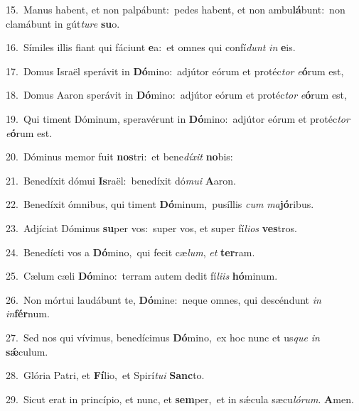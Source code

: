 {\numbfont\textcolor{\numbcolor}{15.}}~Manus habent, et non palpábunt:~\dagger pedes habent, et non ambu\-\textbf{lá}\-bunt:~\star non clamábunt in gút\-\textit{tu}\-\textit{re} \textbf{su}\-o.\par
{\numbfont\textcolor{\numbcolor}{16.}}~Símiles illis fiant qui fáciunt \textbf{e}\-a:~\star et omnes qui confí\textit{dunt} \textit{in} \textbf{e}\-is.\par
{\numbfont\textcolor{\numbcolor}{17.}}~Domus Israël sperávit in \textbf{Dó}\-mino:~\star adjútor eórum et protéc\textit{tor} \textit{e}\-\textbf{ó}rum est,\par
{\numbfont\textcolor{\numbcolor}{18.}}~Domus Aaron sperávit in \textbf{Dó}\-mino:~\star adjútor eórum et protéc\textit{tor} \textit{e}\-\textbf{ó}rum est,\par
{\numbfont\textcolor{\numbcolor}{19.}}~Qui timent Dóminum, speravérunt in \textbf{Dó}\-mino:~\star adjútor eórum et protéc\textit{tor} \textit{e}\-\textbf{ó}rum est.\par
{\numbfont\textcolor{\numbcolor}{20.}}~Dóminus memor fuit \textbf{nos}\-tri:~\star et bene\-\textit{dí}\-\textit{xit} \textbf{no}\-bis:\par
{\numbfont\textcolor{\numbcolor}{21.}}~Benedíxit dómui \textbf{Is}\-raël:~\star benedíxit dó\-\textit{mu}\-\textit{i} \textbf{A}\-aron.\par
{\numbfont\textcolor{\numbcolor}{22.}}~Benedíxit ómnibus, qui timent \textbf{Dó}\-minum,~\star pusíllis \textit{cum} \textit{ma}\-\textbf{jó}ribus.\par
{\numbfont\textcolor{\numbcolor}{23.}}~Adjíciat Dóminus \textbf{su}\-per vos:~\star super vos, et super fí\-\textit{li}\-\textit{os} \textbf{ves}\-tros.\par
{\numbfont\textcolor{\numbcolor}{24.}}~Benedícti vos a \textbf{Dó}\-mino,~\star qui fecit cæ\-\textit{lum}\-, \textit{et} \textbf{ter}\-ram.\par
{\numbfont\textcolor{\numbcolor}{25.}}~Cælum cæli \textbf{Dó}\-mino:~\star terram autem dedit fí\-\textit{li}\-\textit{is} \textbf{hó}\-minum.\par
{\numbfont\textcolor{\numbcolor}{26.}}~Non mórtui laudábunt te, \textbf{Dó}\-mine:~\star neque omnes, qui descéndunt \textit{in} \textit{in}\-\textbf{fér}num.\par
{\numbfont\textcolor{\numbcolor}{27.}}~Sed nos qui vívimus, benedícimus \textbf{Dó}\-mino,~\star ex hoc nunc et us\textit{que} \textit{in} \textbf{sǽ}\-culum.\par
{\numbfont\textcolor{\numbcolor}{28.}}~Glória Patri, et \textbf{Fí}\-lio,~\star et Spirí\-\textit{tu}\-\textit{i} \textbf{Sanc}\-to.\par
{\numbfont\textcolor{\numbcolor}{29.}}~Sicut erat in princípio, et nunc, et \textbf{sem}\-per,~\star et in sǽcula sæcu\-\textit{ló}\-\textit{rum}. \textbf{A}\-men.\par
